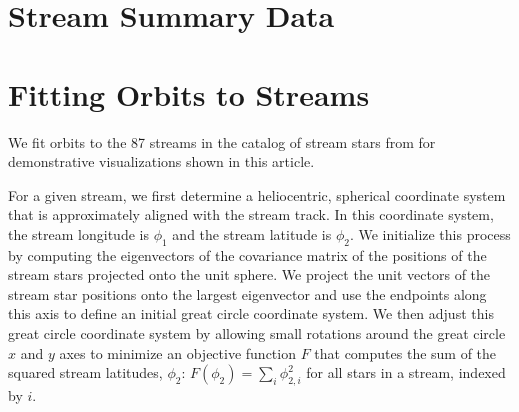 \documentclass[final,5p,times,twocolumn,authoryear]{elsarticle}
\begin{document}
\section{Stream Summary Data}
\label{apx:stream-summary}


\clearpage
\begin{landscape}

\end{landscape}
\restoregeometry

\clearpage
\begin{landscape}

\end{landscape}
\restoregeometry

\clearpage
\begin{landscape}

\end{landscape}
\restoregeometry

\clearpage
\begin{landscape}

\end{landscape}
\restoregeometry

\clearpage

\section{Fitting Orbits to Streams}
\label{apx:stream-fit}

%

We fit orbits to the 87 streams in the catalog of stream stars from \citet{ibata:TODO}
for demonstrative visualizations shown in this article.

For a given stream, we first determine a heliocentric, spherical coordinate system that
is approximately aligned with the stream track.
In this coordinate system, the stream longitude is $\phi_1$ and the stream latitude is
$\phi_2$.
We initialize this process by computing the eigenvectors of the covariance matrix of the
positions of the stream stars projected onto the unit sphere.
We project the unit vectors of the stream star positions onto the largest eigenvector
and use the endpoints along this axis to define an initial great circle coordinate
system.
We then adjust this great circle coordinate system by allowing small rotations around
the great circle $x$ and $y$ axes to minimize an objective function $F$ that computes
the sum of the squared stream latitudes, $\phi_2$: $F(\phi_2) = \sum_i \phi_{2,i}^2$ for
all stars in a stream, indexed by $i$.
\end{document}
